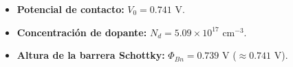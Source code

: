 \documentclass[11pt,a4paper]{article}
\begin{document}
\begin{respuestabox}
\begin{itemize}
    \item \textbf{Potencial de contacto:} $V_0 = 0.741\text{ V}$.
    \item \textbf{Concentración de dopante:} $N_d = 5.09 \times 10^{17}\text{ cm}^{-3}$.
    \item \textbf{Altura de la barrera Schottky:} $\Phi_{Bn} = 0.739\text{ V}$ ($\approx 0.741\text{ V}$).
\end{itemize}
\end{respuestabox}
\end{document}
